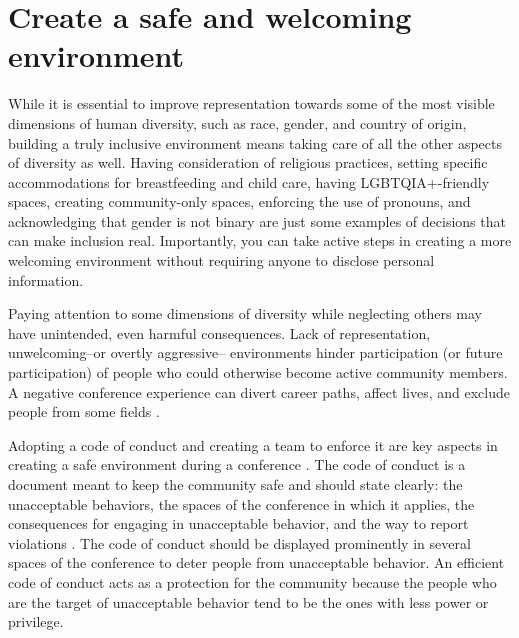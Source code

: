 \documentclass[10pt,letterpaper]{article}
\begin{document}
\section{Create a safe and welcoming environment}
\label{rule_inclusion}

While it is essential to improve representation towards some of the most visible dimensions of human diversity, such as race, gender, and country of origin, building a truly inclusive environment means taking care of all the other aspects of diversity as well. Having consideration of religious practices, setting specific accommodations for breastfeeding and child care, having LGBTQIA+-friendly spaces, creating community-only spaces, enforcing the use of pronouns, and acknowledging that gender is not binary are just some examples of decisions that can make inclusion real.
Importantly, you can take active steps in creating a more welcoming environment without requiring anyone to disclose personal information.

Paying attention to some dimensions of diversity while neglecting others may have unintended, even harmful consequences. Lack of representation, unwelcoming--or overtly aggressive-- environments hinder participation (or future participation) of people who could otherwise become active community members. A negative conference experience can divert career paths, affect lives, and exclude people from some fields \cite{biggsAcademicConferenceChilly2018}. 

Adopting a code of conduct and creating a team to enforce it are key aspects in creating a safe environment during a conference \cite{favaroYourScienceConference2016}.
The code of conduct is a document meant to keep the community safe and should state clearly: the unacceptable behaviors, the spaces of the conference in which it applies, the consequences for engaging in unacceptable behavior, and the way to report violations \cite{auroraHowRespondCode2019}. 
The code of conduct should be displayed prominently in several spaces of the conference to deter people from unacceptable behavior.
An efficient code of conduct acts as a protection for the community because the people who are the target of unacceptable behavior tend to be the ones with less power or privilege.
\end{document}
